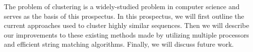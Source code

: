 The problem of clustering is a widely-studied problem in computer science\cite{fasulo_analysis_1999} and serves as the basis of this prospectus.
In this prospectus, we will first outline the current approaches used to cluster highly similar sequences.
Then we will describe our improvements to these existing methods made by utilizing multiple processors and efficient string matching algorithms.
Finally, we will discuss future work. 






